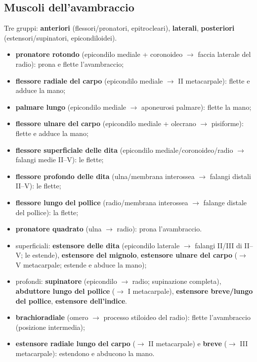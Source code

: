 \subsection{Muscoli dell'avambraccio}
Tre gruppi: \textbf{anteriori} (flessori/pronatori, epitrocleari), \textbf{laterali}, \textbf{posteriori}
(estensori/supinatori, epicondiloidei).
\begin{itemize}
  \item \textbf{pronatore rotondo} (epicondilo mediale + coronoideo $\rightarrow$ faccia laterale del
    radio): prona e flette l'avambraccio;
  \item \textbf{flessore radiale del carpo} (epicondilo mediale $\rightarrow$ II metacarpale): flette
    e adduce la mano;
  \item \textbf{palmare lungo} (epicondilo mediale $\rightarrow$ aponeurosi palmare): flette la mano;
  \item \textbf{flessore ulnare del carpo} (epicondilo mediale + olecrano $\rightarrow$ pisiforme):
    flette e adduce la mano;
  \item \textbf{flessore superficiale delle dita} (epicondilo mediale/coronoideo/radio $\rightarrow$
    falangi medie II--V): le flette;
  \item \textbf{flessore profondo delle dita} (ulna/membrana interossea $\rightarrow$ falangi
    distali II--V): le flette;
  \item \textbf{flessore lungo del pollice} (radio/membrana interossea $\rightarrow$ falange distale
    del pollice): la flette;
  \item \textbf{pronatore quadrato} (ulna $\rightarrow$ radio): prona l'avambraccio.
\end{itemize}
\begin{itemize}
  \item superficiali: \textbf{estensore delle dita} (epicondilo laterale $\rightarrow$ falangi II/III
    di II--V; le estende), \textbf{estensore del mignolo}, \textbf{estensore ulnare del carpo}
    ($\rightarrow$ V metacarpale; estende e abduce la mano);
  \item profondi: \textbf{supinatore} (epicondilo $\rightarrow$ radio; supinazione completa),
    \textbf{abduttore lungo del pollice} ($\rightarrow$ I metacarpale), \textbf{estensore breve/lungo
    del pollice}, \textbf{estensore dell'indice}.
\end{itemize}
\begin{itemize}
  \item \textbf{brachioradiale} (omero $\rightarrow$ processo stiloideo del radio): flette
    l'avambraccio (posizione intermedia);
  \item \textbf{estensore radiale lungo del carpo} ($\rightarrow$ II metacarpale) e \textbf{breve}
    ($\rightarrow$ III metacarpale): estendono e abducono la mano.
\end{itemize}

